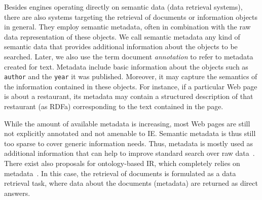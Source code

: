 Besides engines operating directly on semantic data (data retrieval systems), there are also systems targeting the retrieval of documents or information objects in general. They employ semantic metadata, often in combination with the raw data representation of these objects. We call semantic metadata any kind of semantic data that provides additional information about the objects to be searched. Later, we also use the term document \emph{annotation} to refer to metadata created for text. Metadata include basic information about the objects such as \verb+author+ and the \verb+year+ it was published. Moreover, it may capture the semantics of the information contained in these objects. For instance, if a particular Web page is about a restaurant, its metadata may contain a structured description of that restaurant (as RDFa) corresponding to the text contained in the page. 

While the amount of available metadata is increasing, most Web pages are still not explicitly annotated and not amenable to IE. Semantic metadata is thus still too sparse to cover generic information needs. Thus, metadata is mostly used as additional information that can help to improve standard search over raw data~\cite{DBLP:journals/tkde/CastellsFV07,DBLP:journals/ws/FernandezCLVCM11}. 
There exist also proposals for ontology-based IR, which completely relies on metadata~\cite{DBLP:conf/sigmod/KandoganKRVZ06}. In this case, the retrieval of documents is formulated as a data retrieval task, where data about the documents (metadata) are returned as direct answers. 

